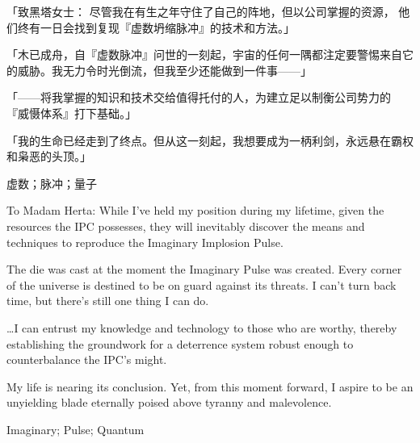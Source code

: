 \begin{abstractCN}
    「致黑塔女士： 尽管我在有生之年守住了自己的阵地，但以公司掌握的资源， 他们终有一日会找到复现『虚数坍缩脉冲』的技术和方法。」


    「木已成舟，自『虚数脉冲』问世的一刻起，宇宙的任何一隅都注定要警惕来自它的威胁。我无力令时光倒流，但我至少还能做到一件事——」


    「——将我掌握的知识和技术交给值得托付的人，为建立足以制衡公司势力的 『威慑体系』打下基础。」


    「我的生命已经走到了终点。但从这一刻起，我想要成为一柄利剑，永远悬在霸权和枭恶的头顶。」

    \keywordsCN 虚数；脉冲；量子
\end{abstractCN}

\begin{abstractENG}
    \textquotedbl
    To Madam Herta: While I've held my position during my lifetime,
    given the resources the IPC possesses, they will inevitably discover the means and techniques to reproduce the Imaginary Implosion Pulse.
    \textquotedbl

    \textquotedbl
    The die was cast at the moment the Imaginary Pulse was created.
    Every corner of the universe is destined to be on guard against its threats.
    I can't turn back time, but there's still one thing I can do.
    \textquotedbl

    \textquotedbl
    \ldots I can entrust my knowledge and technology to those who are worthy,
    thereby establishing the groundwork for a deterrence system robust enough to counterbalance the IPC's might.
    \textquotedbl

    \textquotedbl
    My life is nearing its conclusion.
    Yet, from this moment forward, I aspire to be an unyielding blade eternally poised above tyranny and malevolence.
    \textquotedbl

    \keywordsENG Imaginary; Pulse; Quantum
\end{abstractENG}